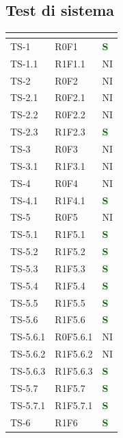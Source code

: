 \subsection{Test di sistema}
\begin{longtable}{|C{2.5cm}|C{2.5cm}|C{2.5cm}|}
	\hline
	\textbf{\color{title_text}{Test}} & \textbf{\color{title_text}{Requisito}} & \textbf{\color{title_text}{Stato}} \\
	\hline
	\endhead
	{TS-1} & {R0F1} & \textcolor{darkgreen}{\textbf{S}}\\
	\hline
	{TS-1.1} & {R1F1.1}& {NI}\\
	\hline
	{TS-2} & {R0F2}  & {NI}\\
	\hline
	{TS-2.1} & {R0F2.1}  & {NI}\\
	\hline
	{TS-2.2} & {R0F2.2} & {NI}\\
	\hline
	{TS-2.3} & {R1F2.3}  & \textcolor{darkgreen}{\textbf{S}}\\
	\hline
	{TS-3} & {R0F3} & {NI}\\
	\hline
	{TS-3.1} & {R1F3.1} & {NI}\\
	\hline
	{TS-4} & {R0F4} & {NI}\\
	\hline
	{TS-4.1} & {R1F4.1} & \textcolor{darkgreen}{\textbf{S}}\\
	\hline
	{TS-5} & {R0F5} & {NI}\\
	\hline
	{TS-5.1} & {R1F5.1} & \textcolor{darkgreen}{\textbf{S}}\\
	\hline
	{TS-5.2} & {R1F5.2}  & \textcolor{darkgreen}{\textbf{S}}\\
	\hline
	{TS-5.3} & {R1F5.3} & \textcolor{darkgreen}{\textbf{S}}\\
	\hline
	{TS-5.4} & {R1F5.4} & \textcolor{darkgreen}{\textbf{S}}\\
	\hline
	{TS-5.5} & {R1F5.5} & \textcolor{darkgreen}{\textbf{S}}\\
	\hline
	{TS-5.6} & {R1F5.6} & \textcolor{darkgreen}{\textbf{S}}\\
	\hline
	{TS-5.6.1} & {R0F5.6.1} & {NI}\\
	\hline
	{TS-5.6.2} & {R1F5.6.2} & {NI}\\
	\hline
	{TS-5.6.3} & {R1F5.6.3} & \textcolor{darkgreen}{\textbf{S}}\\
	\hline
	{TS-5.7} & {R1F5.7} & \textcolor{darkgreen}{\textbf{S}}\\
	\hline
	{TS-5.7.1} & {R1F5.7.1} & \textcolor{darkgreen}{\textbf{S}}\\
	\hline
	{TS-6} & {R1F6} & \textcolor{darkgreen}{\textbf{S}}\\

\end{longtable}
